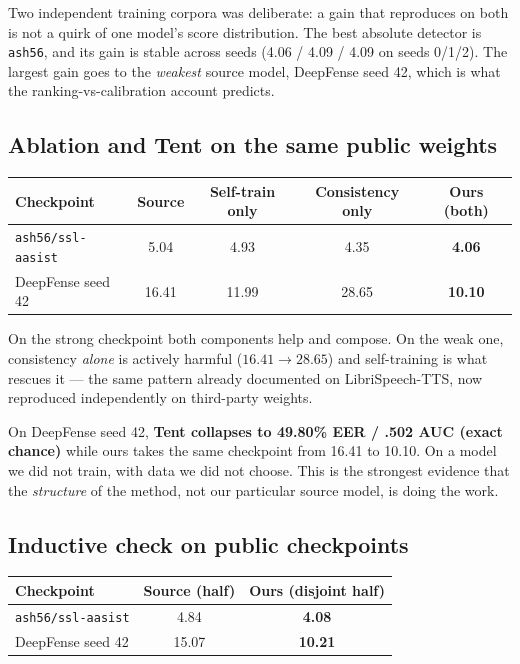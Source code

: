 \documentclass[11pt]{article}
\begin{document}
Two independent training corpora was deliberate: a gain that reproduces on both
is not a quirk of one model's score distribution. The best absolute detector is
\texttt{ash56}, and its gain is stable across seeds (4.06 / 4.09 / 4.09 on seeds
0/1/2). The largest gain goes to the \emph{weakest} source model, DeepFense
seed 42, which is what the ranking-vs-calibration account predicts.

\subsection*{Ablation and Tent on the same public weights}
\begin{table}[h]
\centering
\begin{tabular}{@{}lcccc@{}}
\toprule
Checkpoint & Source & Self-train only & Consistency only & Ours (both) \\
\midrule
\texttt{ash56/ssl-aasist} & 5.04 & 4.93 & 4.35 & \textbf{4.06} \\
DeepFense seed 42 & 16.41 & 11.99 & \cellcolor{red!10}28.65 & \textbf{10.10} \\
\bottomrule
\end{tabular}
\end{table}

On the strong checkpoint both components help and compose. On the weak one,
consistency \emph{alone} is actively harmful ($16.41 \to 28.65$) and
self-training is what rescues it --- the same pattern already documented on
LibriSpeech-TTS, now reproduced independently on third-party weights.

On DeepFense seed 42, \textbf{Tent collapses to 49.80\% EER / .502 AUC (exact
chance)} while ours takes the same checkpoint from 16.41 to 10.10. On a model
we did not train, with data we did not choose. This is the strongest evidence
that the \emph{structure} of the method, not our particular source model, is
doing the work.

\subsection*{Inductive check on public checkpoints}
\begin{table}[h]
\centering
\begin{tabular}{@{}lcc@{}}
\toprule
Checkpoint & Source (half) & Ours (disjoint half) \\
\midrule
\texttt{ash56/ssl-aasist} & 4.84 & \textbf{4.08} \\
DeepFense seed 42 & 15.07 & \textbf{10.21} \\
\bottomrule
\end{tabular}
\end{table}
\end{document}
